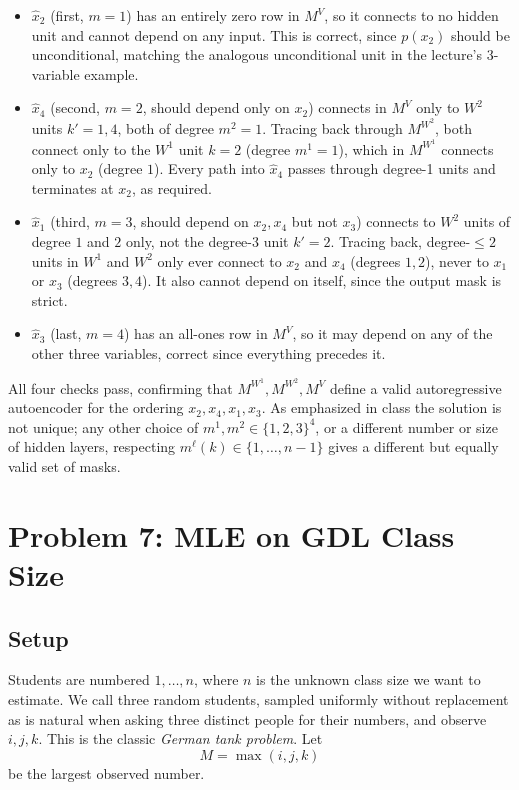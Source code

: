 \documentclass[11pt]{article}
\begin{document}
\begin{itemize}
  \item $\hat x_2$ (first, $m=1$) has an entirely zero row in $M^V$, so it
  connects to no hidden unit and cannot depend on any input. This is correct,
  since $p(x_2)$ should be unconditional, matching the analogous unconditional
  unit in the lecture's 3-variable example.
  \item $\hat x_4$ (second, $m=2$, should depend only on $x_2$) connects in
  $M^V$ only to $W^2$ units $k'=1,4$, both of degree $m^2=1$. Tracing back
  through $M^{W^2}$, both connect only to the $W^1$ unit $k=2$ (degree
  $m^1=1$), which in $M^{W^1}$ connects only to $x_2$ (degree $1$). Every path
  into $\hat x_4$ passes through degree-1 units and terminates at $x_2$, as
  required.
  \item $\hat x_1$ (third, $m=3$, should depend on $x_2, x_4$ but not $x_3$)
  connects to $W^2$ units of degree $1$ and $2$ only, not the degree-3 unit
  $k'=2$. Tracing back, degree-$\le 2$ units in $W^1$ and $W^2$ only ever
  connect to $x_2$ and $x_4$ (degrees $1,2$), never to $x_1$ or $x_3$ (degrees
  $3,4$). It also cannot depend on itself, since the output mask is strict.
  \item $\hat x_3$ (last, $m=4$) has an all-ones row in $M^V$, so it may depend
  on any of the other three variables, correct since everything precedes it.
\end{itemize}

All four checks pass, confirming that $M^{W^1}, M^{W^2}, M^V$ define a valid
autoregressive autoencoder for the ordering $x_2, x_4, x_1, x_3$. As emphasized
in class the solution is not unique; any other choice of
$m^1, m^2 \in \{1,2,3\}^4$, or a different number or size of hidden layers,
respecting $m^\ell(k) \in \{1,\dots,n-1\}$ gives a different but equally valid
set of masks.

\newpage
\section{Problem 7: MLE on GDL Class Size}

\subsection*{Setup}

Students are numbered $1, \dots, n$, where $n$ is the unknown class size we want
to estimate. We call three random students, sampled uniformly without
replacement as is natural when asking three distinct people for their numbers,
and observe $i, j, k$. This is the classic \emph{German tank problem}. Let
\[
  M = \max(i, j, k)
\]
be the largest observed number.
\end{document}

